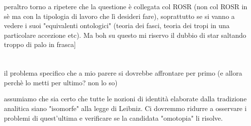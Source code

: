 \documentclass{amsart}
\begin{document}
peraltro torno a ripetere che la questione è collegata col ROSR (non col ROSR in sè ma con la tipologia di lavoro che lì desideri fare), soprattutto se si vanno a vedere i suoi "equivalenti ontologici" (teoria dei fasci, teoria dei tropi in una particolare accezione etc). Ma boh su questo mi riservo il dubbio di star saltando troppo di palo in frasca]
\section{}
il problema specifico che a mio parere si dovrebbe affrontare per primo
(e allora perchè lo metti per ultimo? non lo so)

assumiamo che sia certo che tutte le nozioni di identità elaborate dalla tradizione analitica siano "isomorfe" alla legge di Leibniz. Ci dovremmo ridurre a osservare i problemi di quest'ultima e verificare se la candidata "omotopia" li risolve.
\end{document}
